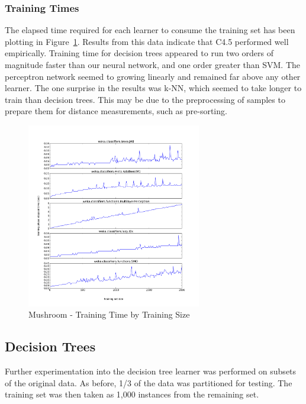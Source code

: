 \documentclass{sig-alternate}
\begin{document}
\subsubsection{Training Times}

The elapsed time required for each learner to consume the training set has been plotting in Figure~\ref{ag-runtime}. Results from this data indicate that C4.5 performed well empirically. Training time for decision trees appeared to run two orders of magnitude faster than our neural network, and one order greater than SVM. The perceptron network seemed to growing linearly and remained far above any other learner. The one surprise in the results was k-NN, which seemed to take longer to train than decision trees. This may be due to the preprocessing of samples to prepare them for distance measurements, such as pre-sorting.


\begin{figure}[!htbp]
    \centering
    \includegraphics[width=3in]{data/agaricus-lepiota/learning-curve-10to2000/runtime.pdf}
    \caption{Mushroom - Training Time by Training Size \label{ag-runtime}}
\end{figure} 


\subsection{Decision Trees}

Further experimentation into the decision tree learner was performed on subsets of the original data. As before, 1/3 of the data was partitioned for testing. The training set was then taken as 1,000 instances from the remaining set.
\end{document}

